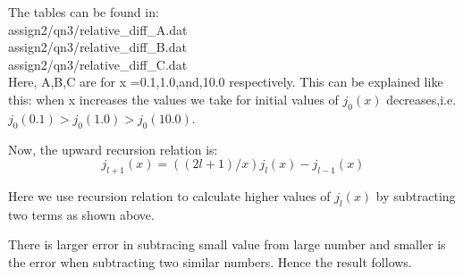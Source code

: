 \documentclass[11pt,a4paper,english]{article}
\begin{document}
		The tables can be found in:\\
		assign2/qn3/relative\_diff\_A.dat \\
		assign2/qn3/relative\_diff\_B.dat \\
		assign2/qn3/relative\_diff\_C.dat \\
		
		Here, A,B,C are for x =0.1,1.0,and,10.0 respectively.
		This can be explained like this: when x increases the values we take for
		initial values of $j_0(x)$ decreases,i.e. $j_0(0.1) > j_0(1.0) > j_0(10.0) $.
		
		Now, the upward recursion relation is:\\
		\begin{equation}
		j_{l+1}(x) =  ((2l + 1)/x) j_l(x) - j_{l-1}(x) 
		\end{equation}
		
		Here we use recursion relation to calculate higher values of $j_l(x)$ by subtracting two terms
		as shown above.		
		
		There is larger error in subtracing small value from large number and smaller is the
		error when subtracting two similar numbers. Hence the result follows.
\end{document}

